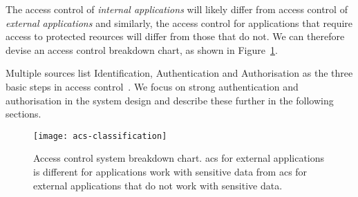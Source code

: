 The access control of \textit{internal applications} will likely differ from access control of \textit{external applications} and similarly, the access control for applications that require access to protected reources will differ from those that do not. We can therefore devise an access control breakdown chart, as shown in Figure~\ref{fig:acs-classification}. 

Multiple sources list Identification, Authentication and Authorisation as the three basic steps in access control~\cite{Harris2008CISSPGuide, 2018AccessSystems, 2003IdentificationAuthorization}. We focus on strong authentication and authorisation in the system design and describe these further in the following sections.

\begin{figure}[ht]
    \centering
    \texttt{[image: acs-classification]}
    \caption{Access control system breakdown chart. \acrshort{acs} for external applications is different for applications work with sensitive data from \acrshort{acs} for external applications that do not work with sensitive data.}
    \label{fig:acs-classification}
\end{figure}





